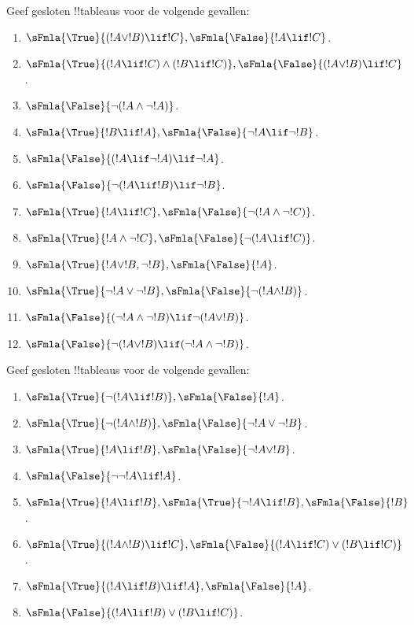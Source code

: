 \documentclass[../../../include/open-logic-section]{subfiles}
\begin{document}
\begin{prob}
Geef gesloten !!{tableau}s voor de volgende gevallen:
\begin{enumerate}
\item $\sFmla{\True}{(!A \lor !B) \lif !C}, \sFmla{\False}{!A \lif !C}$.
\item $\sFmla{\True}{(!A \lif !C) \land (!B \lif !C)}, \sFmla{\False}{(!A \lor !B) \lif !C}$.
\item $\sFmla{\False}{\lnot(!A \land \lnot !A)}$.
\item $\sFmla{\True}{!B \lif !A}, \sFmla{\False}{\lnot !A \lif \lnot !B}$.
\item $\sFmla{\False}{(!A \lif \lnot !A) \lif \lnot !A}$.
\item $\sFmla{\False}{\lnot(!A \lif !B) \lif \lnot !B}$.
\item $\sFmla{\True}{!A \lif !C}, \sFmla{\False}{\lnot (!A \land \lnot !C)}$.
\item $\sFmla{\True}{!A \land \lnot !C}, \sFmla{\False}{\lnot (!A \lif !C)}$.
\item $\sFmla{\True}{!A \lor !B, \lnot !B}, \sFmla{\False}{!A}$.
\item $\sFmla{\True}{\lnot !A \lor \lnot !B}, \sFmla{\False}{\lnot(!A \land !B)}$.
\item $\sFmla{\False}{(\lnot !A \land \lnot !B) \lif\lnot(!A \lor !B)}$.
\item $\sFmla{\False}{\lnot(!A \lor !B) \lif (\lnot !A \land \lnot !B)}$.
\end{enumerate}
\end{prob}

\begin{prob}
Geef gesloten !!{tableau}s voor de volgende gevallen:
\begin{enumerate}
\item $\sFmla{\True}{\lnot(!A \lif !B)}, \sFmla{\False}{!A}$.
\item $\sFmla{\True}{\lnot(!A \land !B)}, \sFmla{\False}{\lnot !A \lor \lnot !B}$.
\item $\sFmla{\True}{!A \lif !B}, \sFmla{\False}{\lnot !A \lor !B}$.
\item $\sFmla{\False}{\lnot \lnot !A \lif !A}$.
\item $\sFmla{\True}{!A \lif !B}, \sFmla{\True}{\lnot !A \lif !B}, \sFmla{\False}{!B}$.
\item $\sFmla{\True}{(!A \land !B) \lif !C}, \sFmla{\False}{(!A \lif !C) \lor (!B \lif !C)}$.
\item $\sFmla{\True}{(!A \lif !B) \lif !A}, \sFmla{\False}{!A}$.
\item $\sFmla{\False}{(!A \lif !B) \lor (!B \lif !C)}$.
\end{enumerate}
\end{prob}
\end{document}
